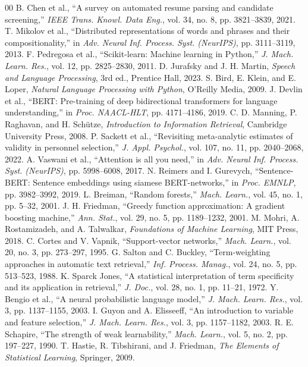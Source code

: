 \documentclass[conference]{IEEEtran}
\begin{document}
\begin{thebibliography}{00}
 B. Chen et al., ``A survey on automated resume parsing and candidate screening,'' \textit{IEEE Trans. Knowl. Data Eng.}, vol. 34, no. 8, pp. 3821--3839, 2021.
 T. Mikolov et al., ``Distributed representations of words and phrases and their compositionality,'' in \textit{Adv. Neural Inf. Process. Syst. (NeurIPS)}, pp. 3111--3119, 2013.
 F. Pedregosa et al., ``Scikit-learn: Machine learning in Python,'' \textit{J. Mach. Learn. Res.}, vol. 12, pp. 2825--2830, 2011.
 D. Jurafsky and J. H. Martin, \textit{Speech and Language Processing}, 3rd ed., Prentice Hall, 2023.
 S. Bird, E. Klein, and E. Loper, \textit{Natural Language Processing with Python}, O'Reilly Media, 2009.
 J. Devlin et al., ``BERT: Pre-training of deep bidirectional transformers for language understanding,'' in \textit{Proc. NAACL-HLT}, pp. 4171--4186, 2019.
 C. D. Manning, P. Raghavan, and H. Schütze, \textit{Introduction to Information Retrieval}, Cambridge University Press, 2008.
 P. Sackett et al., ``Revisiting meta-analytic estimates of validity in personnel selection,'' \textit{J. Appl. Psychol.}, vol. 107, no. 11, pp. 2040--2068, 2022.
 A. Vaswani et al., ``Attention is all you need,'' in \textit{Adv. Neural Inf. Process. Syst. (NeurIPS)}, pp. 5998--6008, 2017.
 N. Reimers and I. Gurevych, ``Sentence-BERT: Sentence embeddings using siamese BERT-networks,'' in \textit{Proc. EMNLP}, pp. 3982--3992, 2019.
 L. Breiman, ``Random forests,'' \textit{Mach. Learn.}, vol. 45, no. 1, pp. 5--32, 2001.
 J. H. Friedman, ``Greedy function approximation: A gradient boosting machine,'' \textit{Ann. Stat.}, vol. 29, no. 5, pp. 1189--1232, 2001.
 M. Mohri, A. Rostamizadeh, and A. Talwalkar, \textit{Foundations of Machine Learning}, MIT Press, 2018.
 C. Cortes and V. Vapnik, ``Support-vector networks,'' \textit{Mach. Learn.}, vol. 20, no. 3, pp. 273--297, 1995.
 G. Salton and C. Buckley, ``Term-weighting approaches in automatic text retrieval,'' \textit{Inf. Process. Manag.}, vol. 24, no. 5, pp. 513--523, 1988.
 K. Sparck Jones, ``A statistical interpretation of term specificity and its application in retrieval,'' \textit{J. Doc.}, vol. 28, no. 1, pp. 11--21, 1972.
 Y. Bengio et al., ``A neural probabilistic language model,'' \textit{J. Mach. Learn. Res.}, vol. 3, pp. 1137--1155, 2003.
 I. Guyon and A. Elisseeff, ``An introduction to variable and feature selection,'' \textit{J. Mach. Learn. Res.}, vol. 3, pp. 1157--1182, 2003.
 R. E. Schapire, ``The strength of weak learnability,'' \textit{Mach. Learn.}, vol. 5, no. 2, pp. 197--227, 1990.
 T. Hastie, R. Tibshirani, and J. Friedman, \textit{The Elements of Statistical Learning}, Springer, 2009.
\end{thebibliography}
\end{document}
